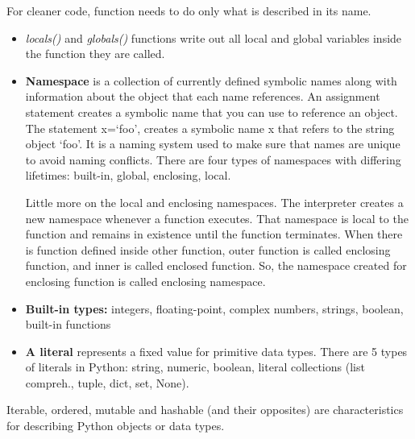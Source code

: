 \documentclass[
  letterpaper,
]{book}
\begin{document}
\begin{tcolorbox}[enhanced jigsaw, arc=.35mm, bottomtitle=1mm, opacitybacktitle=0.6, bottomrule=.15mm, toptitle=1mm, title=\textcolor{quarto-callout-tip-color}{\faLightbulb}\hspace{0.5em}{Tip}, colbacktitle=quarto-callout-tip-color!10!white, toprule=.15mm, colback=white, opacityback=0, rightrule=.15mm, breakable, titlerule=0mm, left=2mm, leftrule=.75mm, colframe=quarto-callout-tip-color-frame, coltitle=black]

For cleaner code, function needs to do only what is described in its
name.

\end{tcolorbox}

\begin{itemize}
\item
  \emph{locals()} and \emph{globals()} functions write out all local and
  global variables inside the function they are called.
\item
  \textbf{Namespace} is a collection of currently defined symbolic names
  along with information about the object that each name references. An
  assignment statement creates a symbolic name that you can use to
  reference an object. The statement x=`foo', creates a symbolic name x
  that refers to the string object `foo'. It is a naming system used to
  make sure that names are unique to avoid naming conflicts. There are
  four types of namespaces with differing lifetimes: built-in, global,
  enclosing, local.

  Little more on the local and enclosing namespaces. The interpreter
  creates a new namespace whenever a function executes. That namespace
  is local to the function and remains in existence until the function
  terminates. When there is function defined inside other function,
  outer function is called enclosing function, and inner is called
  enclosed function. So, the namespace created for enclosing function is
  called enclosing namespace.
\item
  \textbf{Built-in types:} integers, floating-point, complex numbers,
  strings, boolean, built-in functions
\item
  \textbf{A literal} represents a fixed value for primitive data types.
  There are 5 types of literals in Python: string, numeric, boolean,
  literal collections (list compreh., tuple, dict, set, None).
\end{itemize}

Iterable, ordered, mutable and hashable (and their opposites) are
characteristics for describing Python objects or data types.
\end{document}
